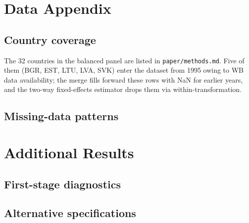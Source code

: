 
\section{Data Appendix}
\label{app:data}

\subsection{Country coverage}
The 32 countries in the balanced panel are listed in
\texttt{paper/methods.md}. Five of them (BGR, EST, LTU, LVA, SVK) enter
the dataset from 1995 owing to WB data availability; the merge fills
forward these rows with NaN for earlier years, and the two-way
fixed-effects estimator drops them via within-transformation.

\subsection{Missing-data patterns}

\section{Additional Results}
\label{app:results}

\subsection{First-stage diagnostics}

\subsection{Alternative specifications}

